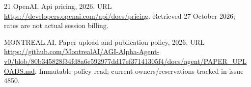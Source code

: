 \documentclass[11pt]{article}
\begin{document}
\begin{thebibliography}{21}
{OpenAI}.
\newblock Api pricing, 2026{}.
\newblock URL \url{https://developers.openai.com/api/docs/pricing}.
\newblock Retrieved 27 October 2026; rates are not actual session billing.

{MONTREAL.AI}.
\newblock Paper upload and publication policy, 2026{}.
\newblock URL
  \url{https://github.com/MontrealAI/AGI-Alpha-Agent-v0/blob/80b345828f34fd8a6e592977dd17ef37141305f4/docs/agent/PAPER_UPLOADS.md}.
\newblock Immutable policy read; current owners/reservations tracked in issue
  4850.

\end{thebibliography}

\end{document}
